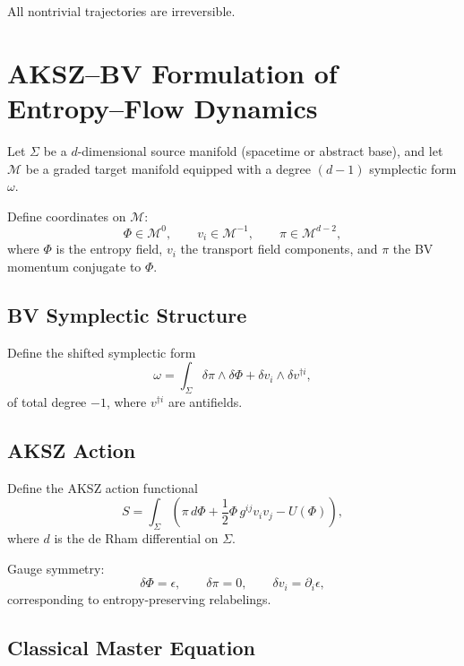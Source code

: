 \documentclass[11pt]{article}
\begin{document}
All nontrivial trajectories are irreversible.

\section{AKSZ--BV Formulation of Entropy--Flow Dynamics}

Let $\Sigma$ be a $d$-dimensional source manifold (spacetime or abstract base),
and let $\mathcal{M}$ be a graded target manifold equipped with a degree
$(d-1)$ symplectic form $\omega$.

Define coordinates on $\mathcal{M}$:
\begin{equation}
\Phi \in \mathcal{M}^{0},
\qquad
v_i \in \mathcal{M}^{-1},
\qquad
\pi \in \mathcal{M}^{d-2},
\end{equation}
where $\Phi$ is the entropy field, $v_i$ the transport field components,
and $\pi$ the BV momentum conjugate to $\Phi$.

\subsection*{BV Symplectic Structure}

Define the shifted symplectic form
\begin{equation}
\omega
=
\int_\Sigma
\delta \pi \wedge \delta \Phi
+
\delta v_i \wedge \delta v^{\dagger i},
\end{equation}
of total degree $-1$, where $v^{\dagger i}$ are antifields.

\subsection*{AKSZ Action}

Define the AKSZ action functional
\begin{equation}
S
=
\int_\Sigma
\left(
\pi \, d\Phi
+
\frac{1}{2}\Phi\, g^{ij} v_i v_j
-
U(\Phi)
\right),
\end{equation}
where $d$ is the de Rham differential on $\Sigma$.

Gauge symmetry:
\begin{equation}
\delta \Phi = \epsilon,
\qquad
\delta \pi = 0,
\qquad
\delta v_i = \partial_i \epsilon,
\end{equation}
corresponding to entropy-preserving relabelings.

\subsection*{Classical Master Equation}
\end{document}

